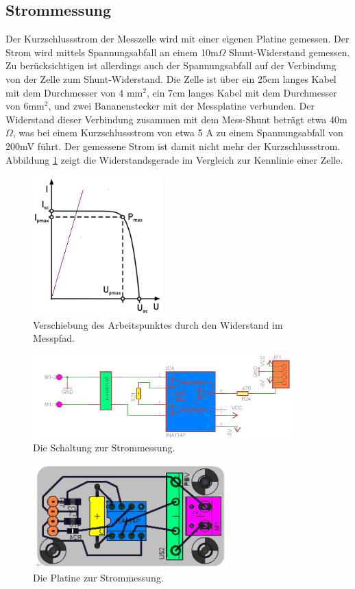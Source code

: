 \documentclass[a4paper,bibtotoc,oneside]{scrbook}
\begin{document}
\subsection{Strommessung}\thispagestyle{empty}
Der Kurzschlussstrom der Messzelle wird mit einer eigenen Platine gemessen. Der Strom wird mittels Spannungsabfall an einem 10m$\Omega$ Shunt-Widerstand gemessen. Zu berücksichtigen ist allerdings auch der Spannungsabfall auf der Verbindung von der Zelle zum Shunt-Widerstand.
Die Zelle ist über ein 25cm langes Kabel mit dem Durchmesser von 4 mm$^2$, ein 7cm langes Kabel mit dem Durchmesser von 6mm$^2$, und zwei Bananenstecker mit der Messplatine verbunden. Der Widerstand dieser Verbindung zusammen mit dem Mess-Shunt beträgt etwa 40m$\Omega$, was bei einem Kurzschlussstrom von etwa 5 A zu einem Spannungsabfall von 200mV führt. Der gemessene Strom ist damit nicht mehr der Kurzschlussstrom. Abbildung \ref{kenn2} zeigt die Widerstandsgerade im Vergleich zur Kennlinie einer Zelle.

\begin{figure}[htbp]
\centering
\includegraphics[width=50mm]{img/kenn2.png}
\caption{Verschiebung des Arbeitspunktes durch den Widerstand im Messpfad.}\label{kenn2}
\end{figure}

\begin{figure}[htbp]
\centering
\includegraphics[width=100mm]{img/i1.png}
\caption{Die Schaltung zur Strommessung.}\label{i1}
\end{figure}

\begin{figure}[htbp]
\centering
\includegraphics[width=75mm]{img/i2.png}
\caption{Die Platine zur Strommessung.}\label{i2}
\end{figure}
\end{document}
